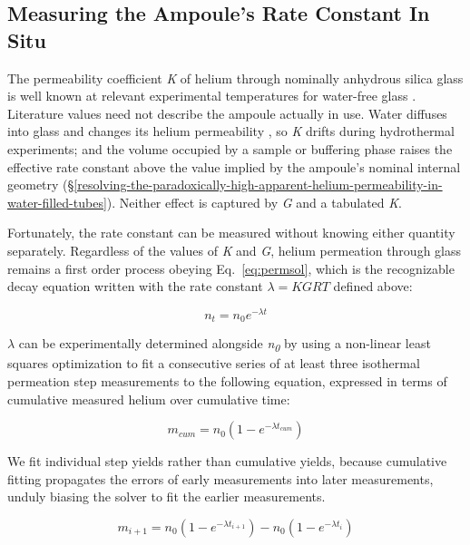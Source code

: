 \subsection{Measuring the Ampoule's Rate Constant In Situ}\label{in-situ-rate-constant}

The permeability coefficient \emph{K} of helium through nominally anhydrous silica glass is well known at relevant experimental temperatures for water-free glass \citep{norton1953,altemose1961,swets1961,rogers1954,masaryk1968}. Literature values need not describe the ampoule actually in use. Water diffuses into glass and changes its helium permeability \citep{shelby1972,tsuru2011}, so \emph{K} drifts during hydrothermal experiments; and the volume occupied by a sample or buffering phase raises the effective rate constant above the value implied by the ampoule's nominal internal geometry (\S\ref{resolving-the-paradoxically-high-apparent-helium-permeability-in-water-filled-tubes}). Neither effect is captured by \emph{G} and a tabulated \emph{K}.

Fortunately, the rate constant can be measured without knowing either quantity separately. Regardless of the values of \emph{K} and \emph{G}, helium permeation through glass remains a first order process obeying Eq.~\eqref{eq:permsol}, which is the recognizable decay equation written with the rate constant \(\lambda = KGRT\) defined above:

\begin{equation}
\label{eq:decay}
n_{t} = n_{0}e^{- \lambda t}
\end{equation}

\(\lambda\) can be experimentally determined alongside \emph{n\textsubscript{0}} by using a non-linear least squares optimization to fit a consecutive series of at least three isothermal permeation step measurements to the following equation, expressed in terms of cumulative measured helium over cumulative time:

\begin{equation}
\label{eq:cumyield}
m_{cum} = n_{0}\left( 1 - e^{- \lambda t_{cum}} \right)
\end{equation}

We fit individual step yields rather than cumulative yields, because cumulative fitting propagates the errors of early measurements into later measurements, unduly biasing the solver to fit the earlier measurements.

\begin{equation}
\label{eq:incyield}
m_{i + 1} = n_{0}\left( 1 - e^{- \lambda t_{i + 1}} \right) - n_{0}\left( 1 - e^{- \lambda t_{i}} \right)
\end{equation}

